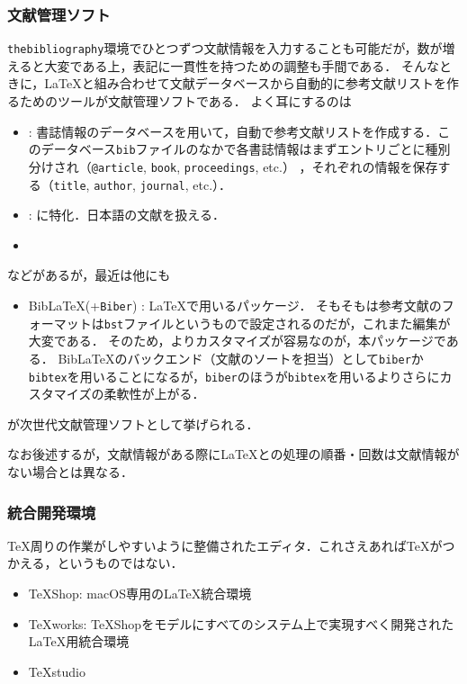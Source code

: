 \documentclass[./main]{subfiles}
\begin{document}
\subsubsection{文献管理ソフト}
\noindent
\verb|thebibliography|環境でひとつずつ文献情報を入力することも可能だが，数が増えると大変である上，表記に一貫性を持つための調整も手間である．
そんなときに，\LaTeX と組み合わせて文献データベースから自動的に参考文献リストを作るためのツールが文献管理ソフトである．
よく耳にするのは
\begin{itemize}
  \item \BibTeX : 書誌情報のデータベースを用いて，自動で参考文献リストを作成する．このデータベース\verb|bib|ファイルのなかで各書誌情報はまずエントリごとに種別分けされ（\verb|@article|, \verb|book|, \verb|proceedings|, etc.） ，それぞれの情報を保存する（\verb|title|, \verb|author|, \verb|journal|, etc.）．
  \item \pBibTeX : \pTeX に特化．日本語の文献を扱える．
  \item \upBibTeX
\end{itemize}
などがあるが，最近は他にも
\begin{itemize}
  \item Bib\LaTeX (+\verb|Biber|) : \LaTeX で用いるパッケージ．
  そもそも\BibTeX は参考文献のフォーマットは\verb|bst|ファイルというもので設定されるのだが，これまた編集が大変である．
  そのため，よりカスタマイズが容易なのが，本パッケージである．
  Bib\LaTeX のバックエンド（文献のソートを担当）として\verb|biber|か\verb|bibtex|を用いることになるが，\verb|biber|のほうが\verb|bibtex|を用いるよりさらにカスタマイズの柔軟性が上がる\supercite{Biber_Wikipedia}．
\end{itemize}
が次世代文献管理ソフトとして挙げられる．

なお後述するが，文献情報がある際に\LaTeX と\BibTeX の処理の順番・回数は文献情報がない場合とは異なる．

\subsubsection{統合開発環境}
\noindent
\TeX 周りの作業がしやすいように整備されたエディタ．これさえあれば\TeX がつかえる，というものではない．
\begin{itemize}
  \item \TeX Shop: macOS専用の\LaTeX 統合環境
  \item \TeX works: \TeX Shopをモデルにすべてのシステム上で実現すべく開発された\LaTeX 用統合環境
  \item \TeX studio
\end{itemize}
\end{document}
